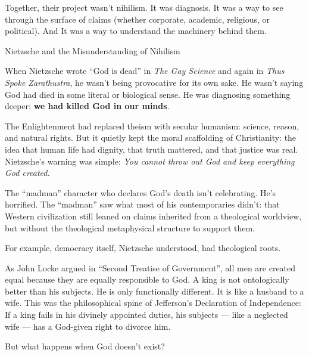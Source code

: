 Together, their project wasn’t nihilism.  
It was diagnosis.  
It was a way to see through the surface of claims (whether corporate, academic, religious, or political). 
And It was a way to understand the machinery behind them.

\medskip

\begin{HistoricalSidebar}{Nietzsche and the Misunderstanding of Nihilism}

  When Nietzsche wrote “God is dead” in \textit{The Gay Science} and again in \textit{Thus Spoke Zarathustra}, 
  he wasn’t being provocative for its own sake.  
  He wasn’t saying God had died in some literal or biological sense.  
  He was diagnosing something deeper: \textbf{we had killed God in our minds}.

  \medskip
  
  The Enlightenment had replaced theism with secular humanism: science, reason, and natural rights.  
  But it quietly kept the moral scaffolding of Christianity: the idea that human life had dignity, that truth mattered, 
  and that justice was real.  
  Nietzsche’s warning was simple: \textit{You cannot throw out God and keep everything God created.}

  \medskip
  
  The ``madman'' character who declares God's death isn’t celebrating. He’s horrified.  
  The ``madman'' saw what most of his contemporaries didn’t: that Western civilization still leaned on 
  claims inherited from a theological worldview, but without the theological metaphysical structure to support them.
  
  \medskip
  
  For example, democracy itself, Nietzsche understood, had theological roots.

  \medskip
  
  As John Locke argued in ``Second Treatise of Government'', all men are created equal because they are equally 
  responsible to God.  
  A king is not ontologically better than his subjects. He is only functionally different. It is like a husband 
  to a wife.  
  This was the philosophical spine of Jefferson’s Declaration of Independence:  
  If a king fails in his divinely appointed duties, his subjects — like a neglected wife — has a God-given right 
  to divorce him.

  \medskip
  
  But what happens when God doesn’t exist?

  \medskip
  

\end{HistoricalSidebar}
